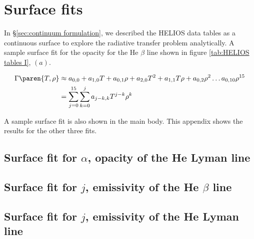 \section{Surface fits}

In \S \eqref{sec:continuum formulation}, we described the HELIOS data tables as a continuous surface to explore the radiative transfer problem analytically. A sample surface fit for the opacity for the He $\beta$ line shown in figure \eqref{tab:HELIOS tables I}, $(a)$. 

\begin{equation}
  \begin{split}
    \Gamma \paren{ T, \rho } 
      & \approx a_{0,0} + a_{1,0} T + a_{0,1} \rho + a_{2,0} T^{2} + a_{1,1} T \rho + a_{0,2} \rho^{2} \dots a_{0,10} \rho^{15}  \\
      & = \sum_{j=0}^{15}{ \sum_{k=0}^{j}{ a_{j-k,k}T^{j-k}\rho^{k} } }
  \end{split}
\end{equation}

A sample surface fit is also shown in the main body. This appendix shows the results for the other three fits.

\subsection{Surface fit for $\alpha$, opacity of the He Lyman line}

\clearpage
\subsection{Surface fit for $j$, emissivity of the He $\beta$ line}

\clearpage
\subsection{Surface fit for $j$, emissivity of the He Lyman line}

\endinput %